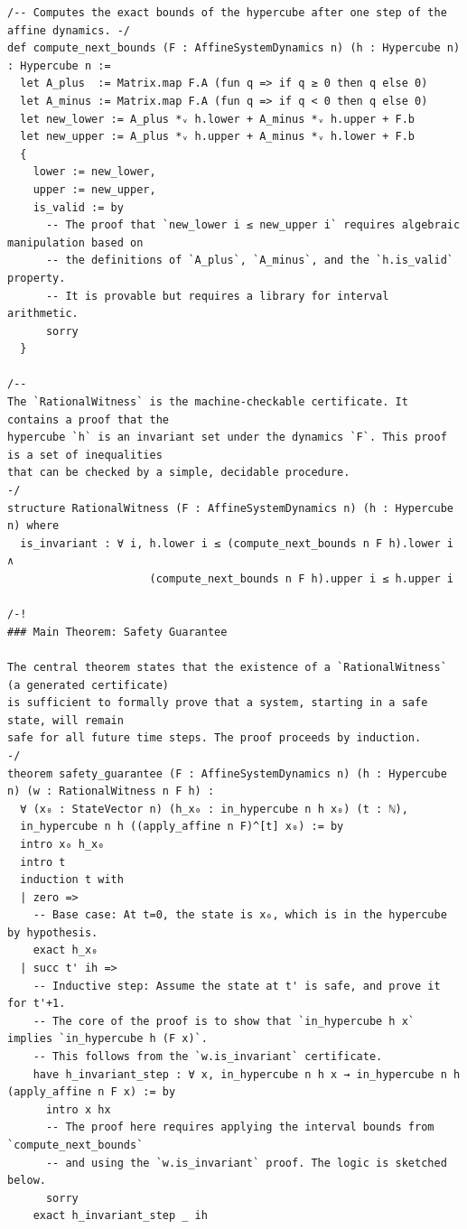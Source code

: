 \documentclass{article}
\begin{document}
\begin{verbatim}
/-- Computes the exact bounds of the hypercube after one step of the affine dynamics. -/
def compute_next_bounds (F : AffineSystemDynamics n) (h : Hypercube n) : Hypercube n :=
  let A_plus  := Matrix.map F.A (fun q => if q ≥ 0 then q else 0)
  let A_minus := Matrix.map F.A (fun q => if q < 0 then q else 0)
  let new_lower := A_plus *ᵥ h.lower + A_minus *ᵥ h.upper + F.b
  let new_upper := A_plus *ᵥ h.upper + A_minus *ᵥ h.lower + F.b
  {
    lower := new_lower,
    upper := new_upper,
    is_valid := by
      -- The proof that `new_lower i ≤ new_upper i` requires algebraic manipulation based on
      -- the definitions of `A_plus`, `A_minus`, and the `h.is_valid` property.
      -- It is provable but requires a library for interval arithmetic.
      sorry
  }

/--
The `RationalWitness` is the machine-checkable certificate. It contains a proof that the
hypercube `h` is an invariant set under the dynamics `F`. This proof is a set of inequalities
that can be checked by a simple, decidable procedure.
-/
structure RationalWitness (F : AffineSystemDynamics n) (h : Hypercube n) where
  is_invariant : ∀ i, h.lower i ≤ (compute_next_bounds n F h).lower i ∧
                      (compute_next_bounds n F h).upper i ≤ h.upper i

/-!
### Main Theorem: Safety Guarantee

The central theorem states that the existence of a `RationalWitness` (a generated certificate)
is sufficient to formally prove that a system, starting in a safe state, will remain
safe for all future time steps. The proof proceeds by induction.
-/
theorem safety_guarantee (F : AffineSystemDynamics n) (h : Hypercube n) (w : RationalWitness n F h) :
  ∀ (x₀ : StateVector n) (h_x₀ : in_hypercube n h x₀) (t : ℕ),
  in_hypercube n h ((apply_affine n F)^[t] x₀) := by
  intro x₀ h_x₀
  intro t
  induction t with
  | zero =>
    -- Base case: At t=0, the state is x₀, which is in the hypercube by hypothesis.
    exact h_x₀
  | succ t' ih =>
    -- Inductive step: Assume the state at t' is safe, and prove it for t'+1.
    -- The core of the proof is to show that `in_hypercube h x` implies `in_hypercube h (F x)`.
    -- This follows from the `w.is_invariant` certificate.
    have h_invariant_step : ∀ x, in_hypercube n h x → in_hypercube n h (apply_affine n F x) := by
      intro x hx
      -- The proof here requires applying the interval bounds from `compute_next_bounds`
      -- and using the `w.is_invariant` proof. The logic is sketched below.
      sorry
    exact h_invariant_step _ ih


\end{verbatim}
\end{document}
